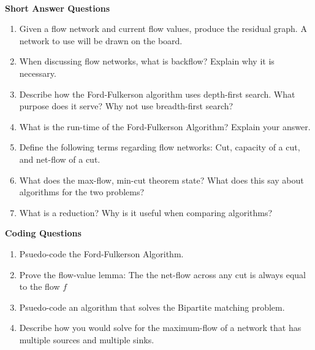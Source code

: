 \documentclass[10pt]{article}
\newcounter{pagenum}
\newcommand{\pageheader}[1]{
\clearpage\vspace*{-0.4in}\noindent{\large\bf{{#1}}}
\addtocounter{pagenum}{1}
\cfoot{}
}
\begin{document}
\newif\ifcomment
\commentfalse
\ifcomment

\fi


\pageheader{Graphs - Advanced}

\noindent \\
\textbf{Short Answer Questions}

\begin{enumerate}
	\setlength\itemsep{0.25em}
	\item Given a flow network and current flow values, produce the residual graph. A network to use will be drawn on the board.
	\item When discussing flow networks, what is backflow? Explain why it is necessary.
	\item Describe how the Ford-Fulkerson algorithm uses depth-first search. What purpose does it serve? Why not use breadth-first search?
	\item What is the run-time of the Ford-Fulkerson Algorithm? Explain your answer.
	\item Define the following terms regarding flow networks: Cut, capacity of a cut, and net-flow of a cut.
	\item What does the max-flow, min-cut theorem state? What does this say about algorithms for the two problems?
	\item What is a reduction? Why is it useful when comparing algorithms?
\end{enumerate}

\vspace{0.5in}

\textbf{Coding Questions}
\begin{enumerate}
	\setlength\itemsep{0.25em}
	\item Psuedo-code the Ford-Fulkerson Algorithm.
	\item Prove the flow-value lemma: The the net-flow across any cut is always equal to the flow $f$
	\item Psuedo-code an algorithm that solves the Bipartite matching problem.
	\item Describe how you would solve for the maximum-flow of a network that has multiple sources and multiple sinks.
\end{enumerate}


\newif\ifcomment
\commentfalse
\ifcomment

\fi

\end{document}
